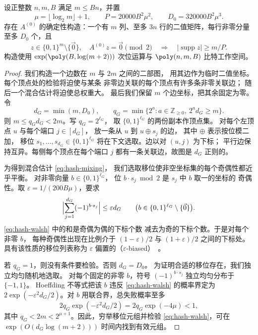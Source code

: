 \begin{lemma}\label{lem:sparse-checks}
设正整数 $n,m,B$ 满足 $m\le Bn$，并置
\[
 \mu=\lfloor\log_2 m\rfloor+1,\qquad
 P=20000B^2\mu^2,\qquad D_0=320000B^2\mu^3.
\]
存在 $A^{(0)}$ 的确定性构造：一个有 $m$ 列、至多 $3n$
行的二值矩阵，每行非零分量至多 $D_0$ 个，且
\[
 z\in\{0,1\}^m\setminus\{\vec{0}\},\quad
 A^{(0)}z=\vec{0}\pmod2
 \quad\Longrightarrow\quad
 |\operatorname{supp}z|\ge m/P.
\]
构造使用 $\exp(\poly(B,\log(m+2)))$ 次位运算与
$\poly(n,m,B)$ 比特工作空间。
\end{lemma}

\begin{proof}
我们构造一个边数在 $m$ 与 $2m$ 之间的二部图，
用其边作为临时二值坐标。每个顶点处的检验将迫使与某条
非零边关联的每个顶点有许多条非零关联边；
随后一个混合估计将迫使总权重大。
最后我们保留 $m$ 个边坐标，把其余固定为零。
令
\[
 d_G=\min(m,D_0),
 \qquad
 q_G=\min\{2^a:a\in\mathbb Z_{\ge0},\ 2^a d_G\ge m\}.
\]
则 $m\le q_Gd_G<2m$。写 $q_G=2^{\ell_G}$，
取 $\{0,1\}^{\ell_G}$ 的两份副本作顶点集。
对每个左顶点 $u$ 与每个端口 $j\in[d_G]$，
放一条从 $u$ 到 $u\oplus s_j$ 的边，
其中 $\oplus$ 表示按位模二加，
移位 $s_1,\ldots,s_{d_G}\in\{0,1\}^{\ell_G}$
将在下文选取。边以对 $(u,j)$ 为下标；
平行边保持互异。每侧每个顶点在每个端口 $j$
都有一条关联边，故图是 $d_G$ 正则的。

为得到混合估计 \eqref{eq:hash-mixing}，
我们选取移位使非空坐标集的每个奇偶性都近乎平衡。
对非零向量 $b\in\{0,1\}^{\ell_G}$，
位 $b\cdot s_j\bmod2$ 是 $s_j$ 中 $b$ 取一的坐标的
奇偶性。取 $\varepsilon=1/(200B\mu)$，要求
\begin{equation}\label{eq:hash-walsh}
 \Bigl|\sum_{j=1}^{d_G}(-1)^{b\cdot s_j}\Bigr|
 \le\varepsilon d_G
 \qquad
 \bigl(b\in\{0,1\}^{\ell_G}\setminus\{\vec{0}\}\bigr).
\end{equation}
\eqref{eq:hash-walsh} 中的和是奇偶为偶的下标个数
减去为奇的下标个数。于是对每个非零 $b$，
每种奇偶性出现在比例介于 $(1-\varepsilon)/2$
与 $(1+\varepsilon)/2$ 之间的下标处。
具有该性质的移位列表称为 $\varepsilon$
偏置的（$\varepsilon$-biased）~\cite[Definitions~2.1--2.2]{NN93}。

若 $q_G=1$，则没有条件要检验。否则 $d_G=D_0$。
为证明合适的移位存在，我们独立均匀随机地选取。
对每个固定的非零 $b$，符号 $(-1)^{b\cdot s_j}$
独立均匀分布于 $\{-1,1\}$。
Hoeffding 不等式把该 $b$ 违反
\eqref{eq:hash-walsh} 的概率界定为
$2\exp(-\varepsilon^2d_G/2)$。对 $b$
用联合界，总失败概率至多
\[
 2q_G\exp(-\varepsilon^2d_G/2)
 =2q_G\exp(-4\mu)<1,
\]
其中 $q_G<2m<2^{\mu+1}$。因此，穷举移位元组并检验
\eqref{eq:hash-walsh}，可在
$\exp(O(d_G\log(m+2)))$ 时间内找到有效元组。


\end{proof}
